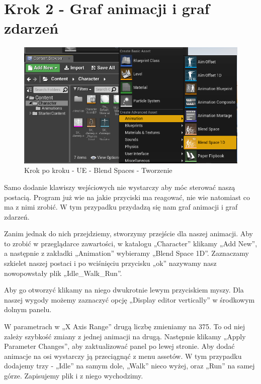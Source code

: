 \documentclass[openright]{xmgr}
\begin{document}
\newpage
\section{Krok 2 - Graf animacji i graf zdarzeń}

\begin{figure}[!htb]
    \begin{center}
    \includegraphics[scale=0.5]{Screeny/UeKrokPoKroku/UE-BlendSpace-Add.png}
    \end{center}
    \caption{Krok po kroku - UE - Blend Spaces - Tworzenie}
\end{figure}

Samo dodanie klawiszy wejściowych nie wystarczy aby móc sterować naszą postacią. Program już wie na jakie przyciski ma reagować, nie wie natomiast co ma z nimi zrobić. W tym przypadku przydadzą się nam graf animacji i graf zdarzeń.

Zanim jednak do nich przejdziemy, stworzymy przejście dla naszej animacji. Aby to zrobić w przeglądarce zawartości, w katalogu „Character” klikamy „Add New”, a następnie z zakładki „Animation” wybieramy „Blend Space 1D”. Zaznaczamy szkielet naszej postaci i po wciśnięciu przycisku „ok” nazywamy nasz nowopowstały plik „Idle\_Walk\_Run”.

Aby go otworzyć klikamy na niego dwukrotnie lewym przyciskiem myszy. Dla naszej wygody możemy zaznaczyć opcję „Display editor vertically” w środkowym dolnym panelu.

W parametrach w „X Axis Range” drugą liczbę zmieniamy na 375. To od niej zależy szybkość zmiany z jednej animacji na drugą. Następnie klikamy „Apply Parameter Changes”, aby zaktualizować panel po lewej stronie. Aby dodać animacje na osi wystarczy ją przeciągnąć z menu assetów. W tym przypadku dodajemy trzy - „Idle” na samym dole, „Walk” nieco wyżej, oraz „Run” na samej górze. Zapisujemy plik i z niego wychodzimy.
\end{document}
